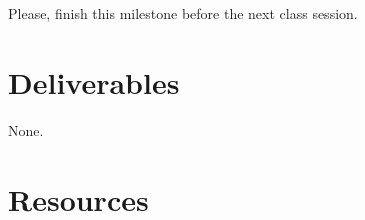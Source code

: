 Please, finish this milestone before the next class session.

\section{Deliverables}

None.

\section{Resources}

\renewcommand{\addcontentsline}[3]{}%



